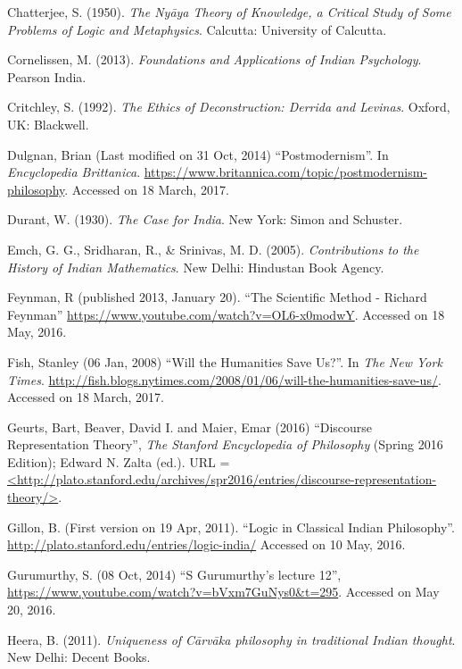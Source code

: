 \begin{thebibliography}{99}
Chatterjee, S. (1950). {\sl The Nyāya Theory of Knowledge, a Critical Study of Some Problems of Logic and Metaphysics}. Calcutta: University of Calcutta.

Cornelissen, M. (2013). {\sl Foundations and Applications of Indian Psychology}. Pearson India.

Critchley, S. (1992). {\sl The Ethics of Deconstruction: Derrida and Levinas}. Oxford, UK: Blackwell.

Dulgnan, Brian (Last modified on 31 Oct, 2014) ``Postmodernism''. In {\sl Encyclopedia Brittanica}. \url{https://www.britannica.com/topic/postmodernism-philosophy}.  Accessed on 18 March, 2017.

Durant, W. (1930). {\sl The Case for India}. New York: Simon and Schuster.

Emch, G. G., Sridharan, R., \& Srinivas, M. D. (2005). {\sl Contributions to the History of Indian Mathematics}. New Delhi: Hindustan Book Agency.

Feynman, R (published 2013, January 20). ``The Scientific Method - Richard Feynman'' \url{https://www.youtube.com/watch?v=OL6-x0modwY}. Accessed on 18 May, 2016.

Fish, Stanley (06 Jan, 2008) ``Will the Humanities Save Us?''. In {\sl The New York Times}. \url{http://fish.blogs.nytimes.com/2008/01/06/will-the-humanities-save-us/}. Accessed on 18 March, 2017.

Geurts, Bart, Beaver, David I. and Maier, Emar (2016) ``Discourse Representation Theory'', {\sl The Stanford Encyclopedia of Philosophy} (Spring 2016 Edition); Edward N. Zalta (ed.). URL = \url{<http://plato.stanford.edu/archives/spr2016/entries/discourse-representation-theory/>}.

Gillon, B. (First version on 19 Apr, 2011). ``Logic in Classical Indian Philosophy''. \url{http://plato.stanford.edu/entries/logic-india/} Accessed on 10 May, 2016.

Gurumurthy, S. (08 Oct, 2014) ``S Gurumurthy's lecture 12'', \url{https://www.youtube.com/watch?v=bVxm7GuNys0&t=295}. Accessed on May 20, 2016. 

Heera, B. (2011). {\sl Uniqueness of Cārvāka philosophy in traditional Indian thought}. New Delhi: Decent Books.


\end{thebibliography}

